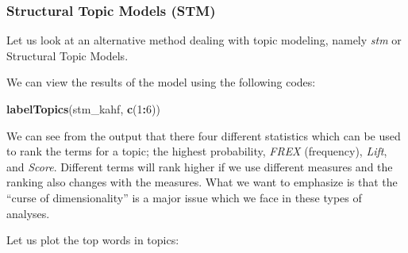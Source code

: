 \documentclass[
]{article}
\newenvironment{Shaded}{\begin{snugshade}}{\end{snugshade}}
\newcommand{\AttributeTok}[1]{\textcolor[rgb]{0.13,0.29,0.53}{#1}}
\newcommand{\DecValTok}[1]{\textcolor[rgb]{0.00,0.00,0.81}{#1}}
\newcommand{\FunctionTok}[1]{\textcolor[rgb]{0.13,0.29,0.53}{\textbf{#1}}}
\newcommand{\NormalTok}[1]{#1}
\newcommand{\OtherTok}[1]{\textcolor[rgb]{0.56,0.35,0.01}{#1}}
\newcommand{\SpecialCharTok}[1]{\textcolor[rgb]{0.81,0.36,0.00}{\textbf{#1}}}
\newcommand{\StringTok}[1]{\textcolor[rgb]{0.31,0.60,0.02}{#1}}
\begin{document}
\hypertarget{structural-topic-models-stm-1}{%
\subsubsection{Structural Topic Models (STM)}\label{structural-topic-models-stm-1}}

Let us look at an alternative method dealing with topic modeling, namely \emph{stm} or Structural Topic Models.

\footnotesize

\begin{Shaded}
\end{Shaded}

\normalsize

We can view the results of the model using the following codes:

\scriptsize

\begin{Shaded}
\begin{Highlighting}[]
\FunctionTok{labelTopics}\NormalTok{(stm\_kahf, }\FunctionTok{c}\NormalTok{(}\DecValTok{1}\SpecialCharTok{:}\DecValTok{6}\NormalTok{))}
\end{Highlighting}
\end{Shaded}

\normalsize

We can see from the output that there four different statistics which can be used to rank the terms for a topic; the highest probability, \emph{FREX} (frequency), \emph{Lift}, and \emph{Score}. Different terms will rank higher if we use different measures and the ranking also changes with the measures. What we want to emphasize is that the ``curse of dimensionality'' is a major issue which we face in these types of analyses.

Let us plot the top words in topics:
\end{document}
